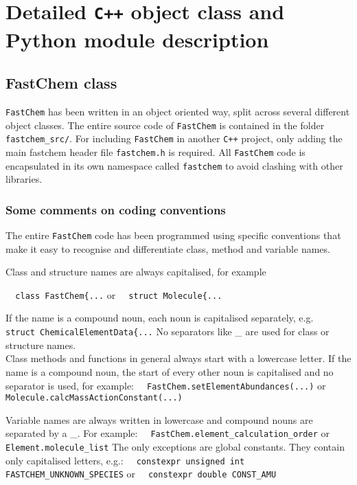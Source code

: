 \documentclass[numbers=noenddot]{aux/fcmanual}
\newcommand{\fc}{\texttt{FastChem}\xspace}
\newcommand{\cpp}{\ttt{C++}\xspace}
\newcommand{\ttt}[1]{\texttt {#1}}
\begin{document}
\part{Detailed \texttt{C++} object class and Python module description}
\label{part:code_details}


\chapter{FastChem class}
\label{sec:fc_class}

\fc has been written in an object oriented way, split across several different object classes. The entire source code of \fc is contained in the folder \verb|fastchem_src/|. For including \fc in another \cpp project, only adding the main fastchem header file \verb|fastchem.h| is required. All \fc code is encapsulated in its own namespace called \lstinline!fastchem! to avoid clashing with other libraries.


\section{Some comments on coding conventions}

The entire \fc code has been programmed using specific conventions that make it easy to recognise and differentiate class, method and variable names.

Class and structure names are always capitalised, for example

\bigbreak
\lstinline!  class FastChem{...!
\bigbreak
or
\bigbreak
\lstinline!  struct Molecule{...!
\bigbreak

If the name is a compound noun, each noun is capitalised separately, e.g.
\bigbreak
\lstinline!  struct ChemicalElementData{...!
\bigbreak
No separators like \_ are used for class or structure names.\\

Class methods and functions in general always start with a lowercase letter. If the name is a compound noun, the start of every other noun is capitalised and no separator is used, for example:
\bigbreak
\lstinline!  FastChem.setElementAbundances(...)!
\bigbreak
or
\bigbreak
\lstinline!  Molecule.calcMassActionConstant(...)!
\bigbreak

Variable names are always written in lowercase and compound nouns are separated by a \_. For example:
\bigbreak
\lstinline!  FastChem.element_calculation_order!
\bigbreak
or
\bigbreak
\lstinline!  Element.molecule_list!
\bigbreak
The only exceptions are global constants. They contain only capitalised letters, e.g.:
\bigbreak
\lstinline!  constexpr unsigned int FASTCHEM_UNKNOWN_SPECIES!
\bigbreak
or
\bigbreak
\lstinline!  constexpr double CONST_AMU!
\bigbreak
\end{document}
